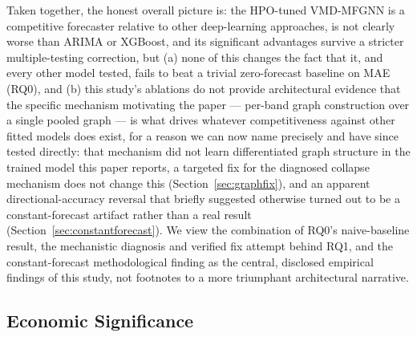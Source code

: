 \documentclass[journal]{IEEEtran}
\begin{document}
Taken together, the honest overall picture is: the HPO-tuned VMD-MFGNN is a competitive forecaster relative to other deep-learning approaches, is not clearly worse than ARIMA or XGBoost, and its significant advantages survive a stricter multiple-testing correction, but (a) none of this changes the fact that it, and every other model tested, fails to beat a trivial zero-forecast baseline on MAE (RQ0), and (b) this study's ablations do not provide architectural evidence that the specific mechanism motivating the paper --- per-band graph construction over a single pooled graph --- is what drives whatever competitiveness against other fitted models does exist, for a reason we can now name precisely and have since tested directly: that mechanism did not learn differentiated graph structure in the trained model this paper reports, a targeted fix for the diagnosed collapse mechanism does not change this (Section~\ref{sec:graphfix}), and an apparent directional-accuracy reversal that briefly suggested otherwise turned out to be a constant-forecast artifact rather than a real result (Section~\ref{sec:constantforecast}). We view the combination of RQ0's naive-baseline result, the mechanistic diagnosis and verified fix attempt behind RQ1, and the constant-forecast methodological finding as the central, disclosed empirical findings of this study, not footnotes to a more triumphant architectural narrative.

\subsection{Economic Significance}
\label{sec:econ}
\end{document}

